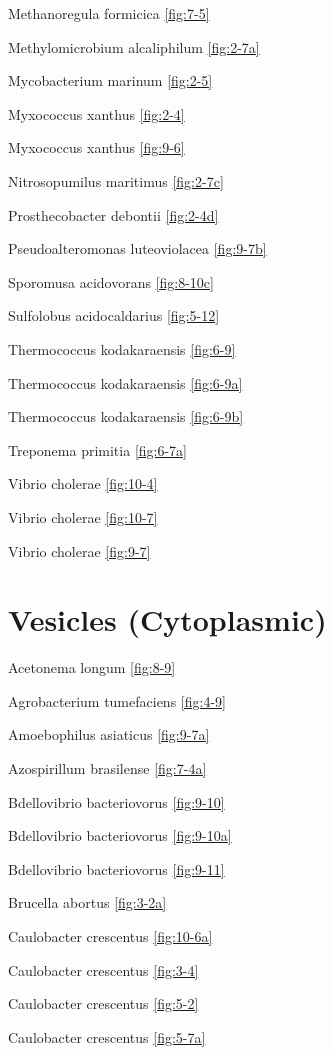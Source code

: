 \documentclass[]{tufte-book}
\begin{document}
Methanoregula formicica \ref{fig:7-5}

Methylomicrobium alcaliphilum \ref{fig:2-7a}

Mycobacterium marinum \ref{fig:2-5}

Myxococcus xanthus \ref{fig:2-4}

Myxococcus xanthus \ref{fig:9-6}

Nitrosopumilus maritimus \ref{fig:2-7c}

Prosthecobacter debontii \ref{fig:2-4d}

Pseudoalteromonas luteoviolacea \ref{fig:9-7b}

Sporomusa acidovorans \ref{fig:8-10c}

Sulfolobus acidocaldarius \ref{fig:5-12}

Thermococcus kodakaraensis \ref{fig:6-9}

Thermococcus kodakaraensis \ref{fig:6-9a}

Thermococcus kodakaraensis \ref{fig:6-9b}

Treponema primitia \ref{fig:6-7a}

Vibrio cholerae \ref{fig:10-4}

Vibrio cholerae \ref{fig:10-7}

Vibrio cholerae \ref{fig:9-7}

\hypertarget{vesicles-cytoplasmic}{%
\section*{Vesicles (Cytoplasmic)}\label{vesicles-cytoplasmic}}

Acetonema longum \ref{fig:8-9}

Agrobacterium tumefaciens \ref{fig:4-9}

Amoebophilus asiaticus \ref{fig:9-7a}

Azospirillum brasilense \ref{fig:7-4a}

Bdellovibrio bacteriovorus \ref{fig:9-10}

Bdellovibrio bacteriovorus \ref{fig:9-10a}

Bdellovibrio bacteriovorus \ref{fig:9-11}

Brucella abortus \ref{fig:3-2a}

Caulobacter crescentus \ref{fig:10-6a}

Caulobacter crescentus \ref{fig:3-4}

Caulobacter crescentus \ref{fig:5-2}

Caulobacter crescentus \ref{fig:5-7a}
\end{document}
